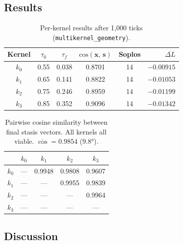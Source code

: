 \documentclass[11pt, a4paper]{article}
\newcommand{\stasis}{\bm{s}}
\newcommand{\sv}{\bm{x}}
\newcommand{\cosim}[2]{\mathrm{cos}\!\left(#1,\, #2\right)}
\begin{document}
\subsection{Results}

\begin{table}[h]
\centering
\caption{Per-kernel results after 1{,}000 ticks (\texttt{multikernel\_geometry}).}
\label{tab:kernels}
\begin{tabular}{cccccr}
\toprule
\textbf{Kernel} & $\tau_0$ & $\tau_f$ & $\cosim{\sv}{\stasis}$ & \textbf{Soplos} & $\overline{\Delta L}$ \\
\midrule
$k_0$ & 0.55 & 0.038 & 0.8701 & 14 & $-0.00915$ \\
$k_1$ & 0.65 & 0.141 & 0.8822 & 14 & $-0.01053$ \\
$k_2$ & 0.75 & 0.246 & 0.8959 & 14 & $-0.01199$ \\
$k_3$ & 0.85 & 0.352 & 0.9096 & 14 & $-0.01342$ \\
\bottomrule
\end{tabular}
\end{table}

\begin{table}[h]
\centering
\caption{Pairwise cosine similarity between final stasis vectors.
         All kernels all viable. $\overline{\cos} = 0.9854$ ($9.8°$).}
\label{tab:pairwise}
\begin{tabular}{ccccc}
\toprule
        & $k_0$ & $k_1$ & $k_2$ & $k_3$ \\
\midrule
$k_0$   & ---   & 0.9948 & 0.9808 & 0.9607 \\
$k_1$   & ---   & ---    & 0.9955 & 0.9839 \\
$k_2$   & ---   & ---    & ---    & 0.9964 \\
$k_3$   & ---   & ---    & ---    & ---    \\
\bottomrule
\end{tabular}
\end{table}

\subsection{Discussion}
\end{document}
